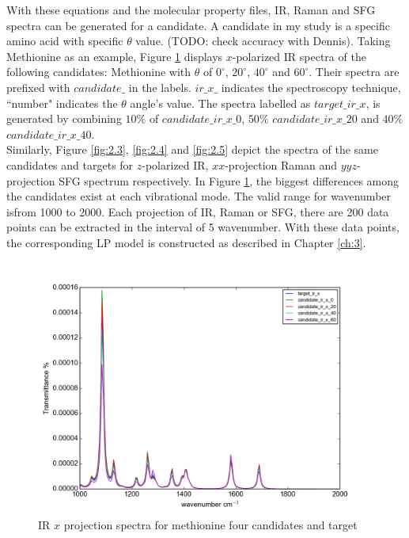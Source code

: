 With these equations and the molecular property files, IR, Raman and SFG spectra can be generated for a candidate. A candidate in my study is a specific amino acid with specific $\theta$ value. (TODO: check accuracy with Dennis). Taking Methionine as an example, Figure \ref{fig:2.2} displays $x$-polarized IR spectra of the following candidates: Methionine with $\theta$ of $0^{\circ}$, $20^{\circ}$, $40^{\circ}$ and $60^{\circ}$. Their spectra are prefixed with $candidate\_$ in the labels. $ir\_x\_$ indicates the spectroscopy technique, ``number" indicates the $\theta$ angle's value. The spectra labelled as $target\_ir\_x$, is generated by combining $10\%$ of $candidate\_ir\_x\_0$, $50\%$ $candidate\_ir\_x\_20$ and $40\%$ $candidate\_ir\_x\_40$. \\

Similarly, Figure \ref{fig:2.3}, \ref{fig:2.4} and \ref{fig:2.5} depict the spectra of the same candidates and targets for $z$-polarized IR, $xx$-projection Raman and $yyz$-projection SFG spectrum respectively. In Figure \ref{fig:2.2}, the biggest differences among the candidates exist at each vibrational mode. The valid range for wavenumber isfrom 1000 to 2000. Each projection of IR, Raman or SFG, there are 200 data points can be extracted in the interval of 5 wavenumber. With these data points, the corresponding LP model is constructed as described in Chapter \ref{ch:3}.\\

\begin{figure}[!ht]
\centering
\includegraphics[scale=0.5]{Figures/Met_candidates_plotting_ir_x.png}
\caption{IR $x$ projection spectra for methionine four candidates and target} \label{fig:2.2}
\end{figure}

